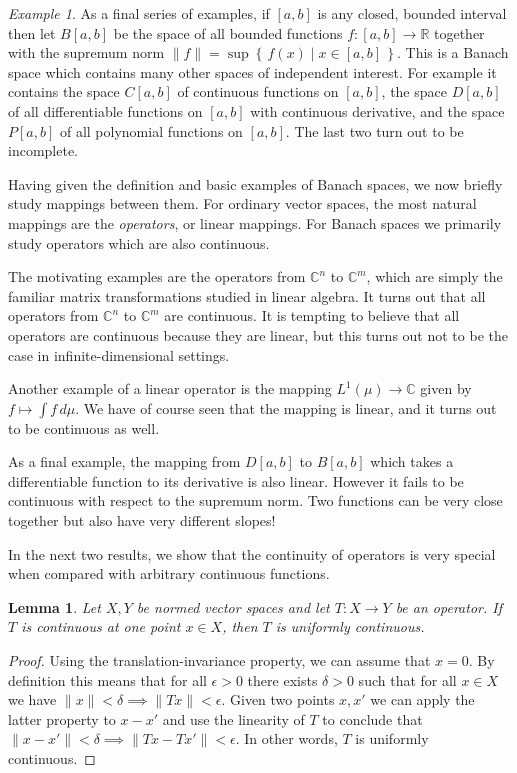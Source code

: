 \documentclass[11pt,oneside]{amsbook}
\newcommand{\set}[1]{\left\{\,#1\,\right\}}
\newcommand{\RR}{{\mathbb R}}
\newcommand{\CC}{{\mathbb C}}
\theoremstyle{definition}
\theoremstyle{plain}
\newtheorem{lem}[thm]{Lemma}
\theoremstyle{definition}
\theoremstyle{remark}
\newtheorem{example}[thm]{Example}
\numberwithin{equation}{section}
\numberwithin{figure}{section}
\begin{document}
\begin{example}
  As a final series of examples, if $[a,b]$ is any closed, bounded interval then let $B[a,b]$ be the space of all bounded functions $f\colon[a,b]\to\RR$ together with the supremum norm $\|f\|=\sup\set{f(x)\mid x\in[a,b]}$. This is a Banach space which contains many other spaces of independent interest. For example it contains the space $C[a,b]$ of continuous functions on $[a,b]$, the space $D[a,b]$ of all differentiable functions on $[a,b]$ with continuous derivative, and the space $P[a,b]$ of all polynomial functions on $[a,b]$. The last two turn out to be incomplete.
\end{example}

Having given the definition and basic examples of Banach spaces, we now briefly study mappings between them. For ordinary vector spaces, the most natural mappings are the \emph{operators}, or linear mappings. For Banach spaces we primarily study operators which are also continuous.

The motivating examples are the operators from $\CC^n$ to $\CC^m$, which are simply the familiar matrix transformations studied in linear algebra. It turns out that all operators from $\CC^n$ to $\CC^m$ are continuous. It is tempting to believe that all operators are continuous because they are linear, but this turns out not to be the case in infinite-dimensional settings.

Another example of a linear operator is the mapping $L^1(\mu)\to\CC$ given by $f\mapsto\int f\,d\mu$. We have of course seen that the mapping is linear, and it turns out to be continuous as well.

As a final example, the mapping from $D[a,b]$ to $B[a,b]$ which takes a differentiable function to its derivative is also linear. However it fails to be continuous with respect to the supremum norm. Two functions can be very close together but also have very different slopes!

In the next two results, we show that the continuity of operators is very special when compared with arbitrary continuous functions.

\begin{lem}
  Let $X,Y$ be normed vector spaces and let $T\colon X\to Y$ be an operator. If $T$ is continuous at one point $x\in X$, then $T$ is uniformly continuous.
\end{lem}

\begin{proof}
  Using the translation-invariance property, we can assume that $x=0$. By definition this means that for all $\epsilon>0$ there exists $\delta>0$ such that for all $x\in X$ we have $\|x\|<\delta\implies\|Tx\|<\epsilon$. Given two points $x,x'$ we can apply the latter property to $x-x'$ and use the linearity of $T$ to conclude that $\|x-x'\|<\delta\implies\|Tx-Tx'\|<\epsilon$. In other words, $T$ is uniformly continuous.
\end{proof}
\end{document}
